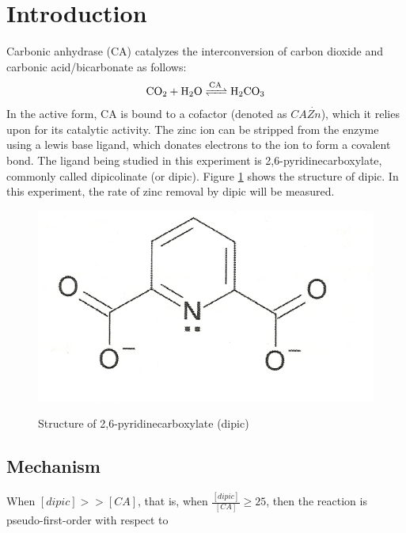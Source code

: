 \section{Introduction}
Carbonic anhydrase (CA) catalyzes the interconversion of carbon dioxide and carbonic acid/bicarbonate as follows:
\begin{align}\label{eqn:ca_reaction}
\ce{CO_2 + H_2O 
<=>[\ce{CA}] 
H_2CO_3}
\end{align}
In the active form, CA is bound to a  cofactor (denoted as $CA\dot{Zn}$), which it relies upon for its catalytic activity. The zinc ion can be stripped from the enzyme using a lewis base ligand, which donates electrons to the ion to form a covalent bond. The ligand being studied in this experiment is 2,6-pyridinecarboxylate, commonly called dipicolinate (or dipic). Figure \ref{fig:dipic} shows the structure of dipic. In this experiment, the rate of zinc removal by dipic will be measured.
\begin{figure}[h]
  \includegraphics[scale=0.5]{./Figures/dipic.jpg}\\
  \caption{Structure of 2,6-pyridinecarboxylate (dipic)\cite{bib:lab_manual}}\label{fig:dipic}
\end{figure}
 
\subsection{Mechanism}
When $[dipic] >> [CA]$, that is, when $\frac{[dipic]}{[CA]} \ge 25$, then the reaction is pseudo-first-order with respect to  